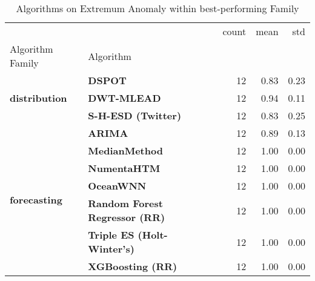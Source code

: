 \begin{table}[h]
\centering
\caption{Algorithms on Extremum Anomaly within best-performing Family}
\label{tab:bp-extremum}
\begin{tabular}{llrrr}
\toprule
 &  & count & mean & std \\
Algorithm Family & Algorithm &  &  &  \\
\midrule
\multirow[t]{3}{*}{\textbf{distribution}} & \textbf{DSPOT} & 12 & 0.83 & 0.23 \\
\textbf{} & \textbf{DWT-MLEAD} & 12 & 0.94 & 0.11 \\
\textbf{} & \textbf{S-H-ESD (Twitter)} & 12 & 0.83 & 0.25 \\
\cline{1-5}
\multirow[t]{7}{*}{\textbf{forecasting}} & \textbf{ARIMA} & 12 & 0.89 & 0.13 \\
\textbf{} & \textbf{MedianMethod} & 12 & 1.00 & 0.00 \\
\textbf{} & \textbf{NumentaHTM} & 12 & 1.00 & 0.00 \\
\textbf{} & \textbf{OceanWNN} & 12 & 1.00 & 0.00 \\
\textbf{} & \textbf{Random Forest Regressor (RR)} & 12 & 1.00 & 0.00 \\
\textbf{} & \textbf{Triple ES (Holt-Winter's)} & 12 & 1.00 & 0.00 \\
\textbf{} & \textbf{XGBoosting (RR)} & 12 & 1.00 & 0.00 \\
\cline{1-5}
\bottomrule
\end{tabular}
\end{table}
